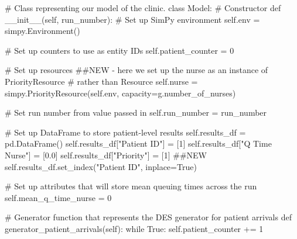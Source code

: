 \documentclass[
  letterpaper,
  DIV=11,
  numbers=noendperiod]{scrreprt}
\newenvironment{Shaded}{}{}
\newcommand{\CommentTok}[1]{\textcolor[rgb]{0.42,0.45,0.49}{#1}}
\newcommand{\ControlFlowTok}[1]{\textcolor[rgb]{0.84,0.23,0.29}{#1}}
\newcommand{\DecValTok}[1]{\textcolor[rgb]{0.00,0.36,0.77}{#1}}
\newcommand{\FloatTok}[1]{\textcolor[rgb]{0.00,0.36,0.77}{#1}}
\newcommand{\FunctionTok}[1]{\textcolor[rgb]{0.44,0.26,0.76}{#1}}
\newcommand{\KeywordTok}[1]{\textcolor[rgb]{0.84,0.23,0.29}{#1}}
\newcommand{\NormalTok}[1]{\textcolor[rgb]{0.14,0.16,0.18}{#1}}
\newcommand{\OperatorTok}[1]{\textcolor[rgb]{0.14,0.16,0.18}{#1}}
\newcommand{\StringTok}[1]{\textcolor[rgb]{0.01,0.18,0.38}{#1}}
\newcommand{\VariableTok}[1]{\textcolor[rgb]{0.89,0.38,0.04}{#1}}
\begin{document}
\begin{tcolorbox}
\begin{Shaded}
\begin{Highlighting}[]
\CommentTok{\# Class representing our model of the clinic.}
\KeywordTok{class}\NormalTok{ Model:}
    \CommentTok{\# Constructor}
    \KeywordTok{def} \FunctionTok{\_\_init\_\_}\NormalTok{(}\VariableTok{self}\NormalTok{, run\_number):}
        \CommentTok{\# Set up SimPy environment}
        \VariableTok{self}\NormalTok{.env }\OperatorTok{=}\NormalTok{ simpy.Environment()}

        \CommentTok{\# Set up counters to use as entity IDs}
        \VariableTok{self}\NormalTok{.patient\_counter }\OperatorTok{=} \DecValTok{0}

        \CommentTok{\# Set up resources}
        \CommentTok{\#\#NEW {-} here we set up the nurse as an instance of PriorityResource}
        \CommentTok{\# rather than Resource}
        \VariableTok{self}\NormalTok{.nurse }\OperatorTok{=}\NormalTok{ simpy.PriorityResource(}\VariableTok{self}\NormalTok{.env,}
\NormalTok{                                            capacity}\OperatorTok{=}\NormalTok{g.number\_of\_nurses)}

        \CommentTok{\# Set run number from value passed in}
        \VariableTok{self}\NormalTok{.run\_number }\OperatorTok{=}\NormalTok{ run\_number}

        \CommentTok{\# Set up DataFrame to store patient{-}level results}
        \VariableTok{self}\NormalTok{.results\_df }\OperatorTok{=}\NormalTok{ pd.DataFrame()}
        \VariableTok{self}\NormalTok{.results\_df[}\StringTok{"Patient ID"}\NormalTok{] }\OperatorTok{=}\NormalTok{ [}\DecValTok{1}\NormalTok{]}
        \VariableTok{self}\NormalTok{.results\_df[}\StringTok{"Q Time Nurse"}\NormalTok{] }\OperatorTok{=}\NormalTok{ [}\FloatTok{0.0}\NormalTok{]}
        \VariableTok{self}\NormalTok{.results\_df[}\StringTok{"Priority"}\NormalTok{] }\OperatorTok{=}\NormalTok{ [}\DecValTok{1}\NormalTok{] }\CommentTok{\#\#NEW}
        \VariableTok{self}\NormalTok{.results\_df.set\_index(}\StringTok{"Patient ID"}\NormalTok{, inplace}\OperatorTok{=}\VariableTok{True}\NormalTok{)}

        \CommentTok{\# Set up attributes that will store mean queuing times across the run}
        \VariableTok{self}\NormalTok{.mean\_q\_time\_nurse }\OperatorTok{=} \DecValTok{0}

    \CommentTok{\# Generator function that represents the DES generator for patient arrivals}
    \KeywordTok{def}\NormalTok{ generator\_patient\_arrivals(}\VariableTok{self}\NormalTok{):}
        \ControlFlowTok{while} \VariableTok{True}\NormalTok{:}
            \VariableTok{self}\NormalTok{.patient\_counter }\OperatorTok{+=} \DecValTok{1}


\end{Highlighting}
\end{Shaded}
\end{tcolorbox}
\end{document}
